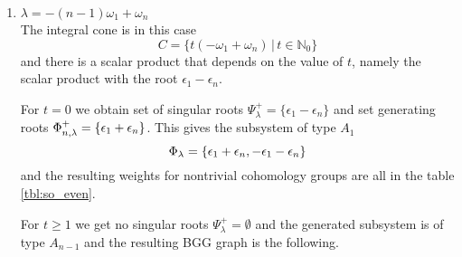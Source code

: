 \documentclass[12pt,a4paper,final]{report}
\begin{document}
\begin{enumerate}
 \item $ \lambda = -(n-1)\omega_1 + \omega_n$\\
  The integral cone is in this case \[C = \{t(-\omega_1 + \omega_n) \,|\, t\in\mathbb{N}_0 \}\] and there is a scalar product that depends on the value of $t$, namely the scalar product with the root $\epsilon_1 - \epsilon_n.$
  
  For $t=0$ we obtain set of singular roots $\Psi^+_\lambda = \{ \epsilon_1-\epsilon_n\}$ and set generating roots $\Phi^+_{n,\lambda} = \{ \epsilon_1 + \epsilon_n \}$. This gives the subsystem of type $A_1$
  \[
   \Phi_\lambda = \{ \epsilon_1 + \epsilon_n, -\epsilon_1 - \epsilon_n\}
  \]
  and the resulting weights for nontrivial cohomology groups are all in the table \ref{tbl:so_even}. 
  
  For $t\geq 1$ we get no singular roots $\Psi^+_\lambda = \emptyset$ and the generated subsystem is of type $A_{n-1}$ and the resulting BGG graph is the following.
\begin{figure}[H]
  \centering
{}
\end{figure}
\end{enumerate}
\end{document}
